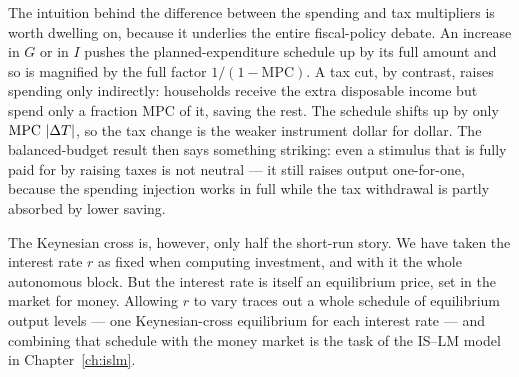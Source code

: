 The intuition behind the difference between the spending and tax multipliers is worth dwelling on, because it underlies the entire fiscal-policy debate. An increase in $G$ or in $I$ pushes the planned-expenditure schedule up by its full amount and so is magnified by the full factor $1/(1-\mathrm{MPC})$. A tax cut, by contrast, raises spending only indirectly: households receive the extra disposable income but spend only a fraction $\mathrm{MPC}$ of it, saving the rest. The schedule shifts up by only $\mathrm{MPC}\,\left|\Delta T\right|$, so the tax change is the weaker instrument dollar for dollar. The balanced-budget result then says something striking: even a stimulus that is fully paid for by raising taxes is not neutral --- it still raises output one-for-one, because the spending injection works in full while the tax withdrawal is partly absorbed by lower saving.



The Keynesian cross is, however, only half the short-run story. We have taken the interest rate $r$ as fixed when computing investment, and with it the whole autonomous block. But the interest rate is itself an equilibrium price, set in the market for money. Allowing $r$ to vary traces out a whole schedule of equilibrium output levels --- one Keynesian-cross equilibrium for each interest rate --- and combining that schedule with the money market is the task of the IS--LM model in Chapter~\ref{ch:islm}.
